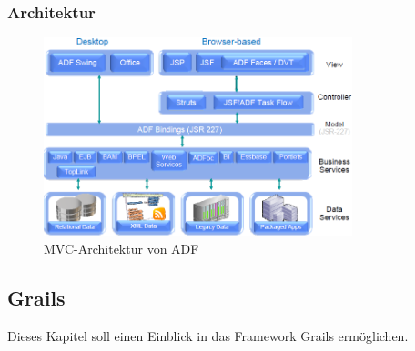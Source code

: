 \subsubsection{Architektur}
\begin{figure}
\centering
\includegraphics[width=0.80\textwidth]{img/MVC-ADF.png}
\caption {MVC-Architektur von ADF}
\end{figure}
\subsection{Grails}
Dieses Kapitel soll einen Einblick in das Framework Grails ermöglichen.
